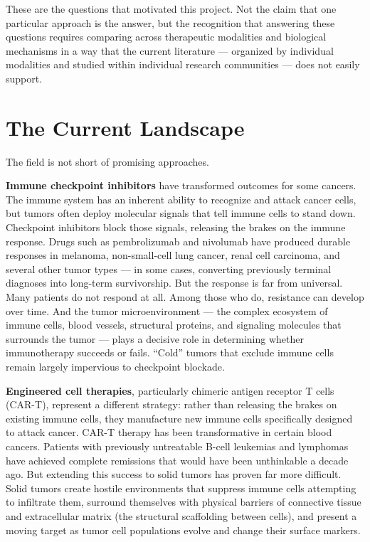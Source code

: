 \documentclass[11pt,twoside,openright]{report}
\begin{document}
These are the questions that motivated this project. Not the claim that one particular approach is the answer, but the recognition that answering these questions requires comparing across therapeutic modalities and biological mechanisms in a way that the current literature --- organized by individual modalities and studied within individual research communities --- does not easily support.

\section{The Current Landscape}

The field is not short of promising approaches.

\textbf{Immune checkpoint inhibitors} have transformed outcomes for some cancers. The immune system has an inherent ability to recognize and attack cancer cells, but tumors often deploy molecular signals that tell immune cells to stand down. Checkpoint inhibitors block those signals, releasing the brakes on the immune response. Drugs such as pembrolizumab and nivolumab have produced durable responses in melanoma, non-small-cell lung cancer, renal cell carcinoma, and several other tumor types --- in some cases, converting previously terminal diagnoses into long-term survivorship. But the response is far from universal. Many patients do not respond at all. Among those who do, resistance can develop over time. And the tumor microenvironment --- the complex ecosystem of immune cells, blood vessels, structural proteins, and signaling molecules that surrounds the tumor --- plays a decisive role in determining whether immunotherapy succeeds or fails. ``Cold'' tumors that exclude immune cells remain largely impervious to checkpoint blockade.

\textbf{Engineered cell therapies}, particularly chimeric antigen receptor T cells (CAR-T), represent a different strategy: rather than releasing the brakes on existing immune cells, they manufacture new immune cells specifically designed to attack cancer. CAR-T therapy has been transformative in certain blood cancers. Patients with previously untreatable B-cell leukemias and lymphomas have achieved complete remissions that would have been unthinkable a decade ago. But extending this success to solid tumors has proven far more difficult. Solid tumors create hostile environments that suppress immune cells attempting to infiltrate them, surround themselves with physical barriers of connective tissue and extracellular matrix (the structural scaffolding between cells), and present a moving target as tumor cell populations evolve and change their surface markers.
\end{document}
